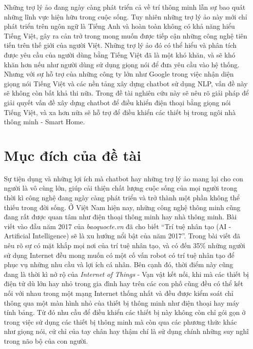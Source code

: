 \documentclass[12pt]{report}
\begin{document}
Những trợ lý ảo đang ngày càng phát triển cả về trí thông minh lẫn sự bao quát những lĩnh vực hiện hữu trong cuộc sống. Tuy nhiên những trợ lý ảo này mới chỉ phát triển trên ngôn ngữ là Tiếng Anh và hoàn toàn không có khả năng hiểu Tiếng Việt, gây ra cản trở trong mong muốn được tiếp cận những công nghệ tiên tiến trên thế giới của người Việt. Những trợ lý ảo đó có thể hiểu và phân tích được yêu cầu của người dùng bằng Tiếng Việt đã là một khó khăn, và sẽ khó khăn hơn nếu như người dùng sử dụng giọng nói để đưa yêu cầu vào hệ thống. Nhưng với sự hỗ trợ của những công ty lớn như Google trong việc nhận diện giọng nói Tiếng Việt và các nền tảng xây dựng chatbot sử dụng NLP, vấn đề này sẽ không còn bất khả thi nữa. Trong đề tài nghiên cứu này sẽ nêu rõ giải pháp để giải quyết vấn đề xây dựng chatbot để điều khiển điện thoại bằng giọng nói Tiếng Việt, và xa hơn nữa sẽ hỗ trợ để điều khiển các thiết bị trong ngôi nhà thông minh - Smart Home.

\section{Mục đích của đề tài}

Sự tiện dụng và những lợi ích mà chatbot hay những trợ lý ảo mang lại cho con người là vô cùng lớn, giúp cải thiện chất lượng cuộc sống của mọi người trong thời kì công nghệ đang ngày càng phát triển và trở thành một phần không thể thiếu trong đời sống. Ở Việt Nam hiện nay, những công nghệ thông minh cũng đang rất được quan tâm như điện thoại thông minh hay nhà thông minh. Bài viết vào đầu năm 2017 của \textit{baoquocte.vn} đã cho biết ``Trí tuệ nhân tạo (AI - Artificial Intelligence) sẽ là xu hướng nổi bật của năm 2017''\cite{tech-trending}. Trong bài viết đã nêu rõ sự có mặt khắp mọi nơi của trí tuệ nhân tạo, và có đến 35\% những người sử dụng Internet đều mong muốn có một cố vấn robot có trí tuệ nhân tạo để phục vụ những nhu cầu và lợi ích cá nhân. Bên cạnh đó, thời điểm này cũng đang là thời kì nở rộ của \textit{Internet of Things} - Vạn vật kết nối, khi mà các thiết bị điện tử dù lớn hay nhỏ trong gia đình hay trên các con phố cũng đều có thể kết nối với nhau trong một mạng Internet thống nhất và đều được kiểm soát chỉ thông qua một màn hình nhỏ của thiết bị thông minh như điện thoại hay máy tính bảng. Từ đó nhu cầu để điều khiển các thiết bị này không còn chỉ gói gọn ở trong việc sử dụng các thiết bị thông minh mà còn qua các phương thức khác như giọng nói, cử chỉ của tay chân hay thậm chí là sử dụng chính những suy nghĩ trong não bộ của con người.
\end{document}
